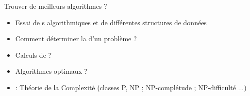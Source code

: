 \documentclass[aspectratio=1610,francais,envcountsect]{beamer}
\begin{document}
\begin{frame}[allowframebreaks]
  \framebreak

  \begin{block}{Trouver de meilleurs algorithmes ?}
    \begin{itemize}
    \item Essai de s algorithmiques et
      de différentes structures de données
    \item Comment déterminer la 
      d'un problème ?
    \item Calculs de  ?
    \item Algorithmes optimaux ?
    \item {} : Théorie de la Complexité
      (classes P, NP ; NP-complétude ; NP-difficulté ...)
    \end{itemize}

  \end{block}
\end{frame}
\end{document}
